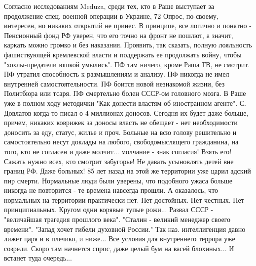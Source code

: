 Согласно исследованиям Meduza, среди тех, кто в Раше выступает за продолжение спец. военной операции в Украине, 72%
Опрос, по-своему, интересен, но никаких открытий не принес. 
В принципе, все логично и понятно - 
Пенсионный фонд РФ уверен, что его точно на фронт не пошлют, а значит, каркать можно громко и без наказания. Проявить, так сказать, полную лояльность фашиствующей кремлевской власти и поддержать ее продолжать войну, чтобы "хохлы-предатели юшкой умылись".
ПФ там ничего, кроме Раша ТВ, не смотрит.
ПФ утратил способность к размышлениям и анализу.
ПФ никогда не имел внутренней самостоятельности.
ПФ боится новой незнакомой жизни, без Политбюра или тсаря.
ПФ смертельно болен СССР-ом головного мозга. 
В Раше уже в полном ходу методички "Как донести властям об иностранном агенте". С. Довлатов когда-то писал о 4 миллионах доносов. Сегодня их будет даже больше, причем, никаких коврижек за доносы власть не обещает - нет необходимости доносить за еду, статус, жилье и проч. 
Больные на всю голову решительно и самостоятельно несут доклады на любого, свободомыслящего гражданина, на того, кто не согласен и даже молчит... молчание - знак согласия! Взять его! Сажать нужно всех, кто смотрит забугорье! 
Не давать усыновлять детей вне границ РФ. Даже больных! 
85 лет назад на этой же территории уже царил адский пир смерти. Нормальные люди были уверены, что подобного ужаса больше никогда не повторится - те времена навсегда прошли.
А оказалось, что нормальных на территории практически нет. Нет достойных. Нет честных. Нет принципиальных. 
Кругом одни корявые тупые рожи...
Развал СССР - "величайшая трагедия прошлого века".
"Сталин - великий менеджер своего времени".
"Запад хочет гибели духовной России."
Так наз. интеллигенция давно лижет царя и в плечико, и ниже... 
Все условия для внутреннего террора уже созрели. 
Скоро там начнется спрос, даже целый бум на васей блохиных... 
И встанет туда очередь...

